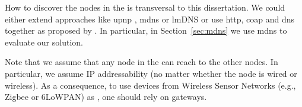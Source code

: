 How to discover the nodes in the \Space{} is transversal to this dissertation.
We could either extend approaches like \ac{upnp} , \ac{mdns}  or lmDNS \citep{jara_light-weight_2012} or use \acs{http}, \ac{coap}  and \ac{dns} together as proposed by \citet{ishaq_facilitating_2012,ishaq_enabling_2014}.
In particular, in Section~\ref{sec:mdns} we use \ac{mdns} to evaluate our solution.

Note that we assume that any node in the \Space{} can reach to the other nodes.
In particular, we assume IP addressability (no matter whether the node is wired or wireless).
As a consequence, to use devices from Wireless Sensor Networks (e.g., Zigbee or 6LoWPAN) as \providers{}, one should rely on gateways.



%
%



